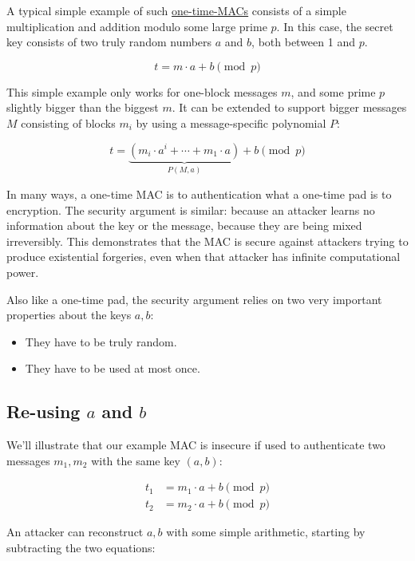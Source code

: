 \documentclass[11pt,ebook,table,dvipsnames]{memoir}
\begin{document}
A typical simple example of such \hyperref[One-time MACs]{one-time-MACs} consists of a simple
multiplication and addition modulo some large prime $p$. In this case,
the secret key consists of two truly random numbers $a$ and $b$, both
between 1 and $p$.

\[
t = m \cdot a + b \pmod p
\]

This simple example only works for one-block messages $m$, and some
prime $p$ slightly bigger than the biggest $m$. It can be extended to
support bigger messages $M$ consisting of blocks $m_i$ by using a
message-specific polynomial $P$:

\[
t = \underbrace{(m_i \cdot a^i + \cdots + m_1 \cdot a)}_{P(M, a)} + b \pmod p
\]

In many ways, a one-time MAC is to authentication what a one-time pad
is to encryption. The security argument is similar: because an
attacker learns no information about the key or the message, because
they are being mixed irreversibly. This demonstrates that the MAC is
secure against attackers trying to produce existential forgeries, even
when that attacker has infinite computational power.

Also like a one-time pad, the security argument relies on two very
important properties about the keys $a, b$:

\begin{itemize}
\item They have to be truly random.
\item They have to be used at most once.
\end{itemize}

\subsection{Re-using $a$ and $b$}
\label{sec-2-7-5-1}

We'll illustrate that our example MAC is insecure if used to authenticate
two messages $m_1, m_2$ with the same key $(a, b)$:

\begin{align*}
t_1 &= m_1 \cdot a + b \pmod p \\
t_2 &= m_2 \cdot a + b \pmod p
\end{align*}

An attacker can reconstruct $a, b$ with some simple arithmetic,
starting by subtracting the two equations:
\end{document}
